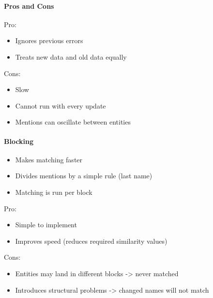\documentclass[10pt,a4paper]{scrreprt}
\begin{document}
\paragraph{Pros and Cons}
Pro:
\begin{itemize}
	\item Ignores previous errors
	\item Treats new data and old data equally
\end{itemize}
Cons:
\begin{itemize}
	\item Slow
	\item Cannot run with every update
	\item Mentions can oscillate between entities
\end{itemize}

\paragraph{Blocking}
\begin{itemize}
	\item Makes matching faster
	\item Divides mentions by a simple rule (last name)
	\item Matching is run per block
\end{itemize}
Pro:
\begin{itemize}
	\item Simple to implement
	\item Improves speed (reduces required similarity values)
\end{itemize}
Cons:
\begin{itemize}
	\item Entities may land in different blocks -> never matched
	\item Introduces structural problems -> changed names will not match
\end{itemize}
\end{document}
